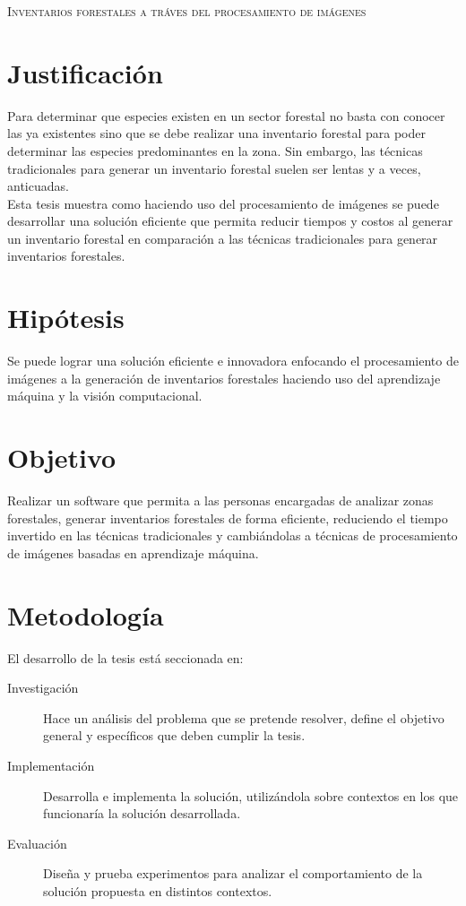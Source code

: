 \documentclass{article}
\begin{document}
\vspace*{-26mm}\begin{center} {\scshape\LARGE Inventarios forestales a tráves del procesamiento de imágenes \par} \end{center}

\section*{Justificación}
Para determinar que especies existen en un sector forestal no basta con conocer las ya existentes sino que se debe realizar una inventario forestal para poder determinar las especies predominantes en la zona. Sin embargo, las técnicas tradicionales para generar un inventario forestal suelen ser lentas y a veces, anticuadas.\newline\\
Esta tesis muestra como haciendo uso del procesamiento de imágenes se puede desarrollar una solución eficiente que permita reducir tiempos y costos al generar un inventario forestal en comparación a las técnicas tradicionales para generar inventarios forestales.

\section*{Hipótesis}
Se puede lograr una solución eficiente e innovadora enfocando el procesamiento de imágenes a la generación de inventarios forestales haciendo uso del aprendizaje máquina y la visión computacional.

\section*{Objetivo}
Realizar un software que permita a las personas encargadas de analizar zonas forestales, generar inventarios forestales de forma eficiente, reduciendo el tiempo invertido en las técnicas tradicionales y cambiándolas a técnicas de procesamiento de imágenes basadas en aprendizaje máquina.

\section*{Metodología}
El desarrollo de la tesis está seccionada en:

\begin{description}
\item[Investigación]{Hace un análisis del problema que se pretende resolver, define el objetivo general y específicos que deben cumplir la tesis.}

\item[Implementación]{Desarrolla e implementa la solución, utilizándola sobre contextos en los que funcionaría la solución desarrollada. }

\item[Evaluación]{Diseña y prueba experimentos para analizar el comportamiento de la solución propuesta en distintos contextos.}
\end{description}
\end{document}
